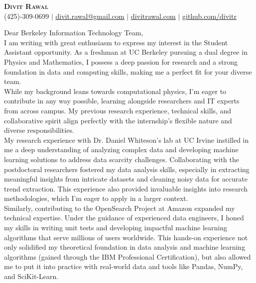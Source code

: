 \documentclass[letterpaper,11pt]{article}
\begin{document}
\begin{center}
    \textbf{\Huge \scshape Divit Rawal} \\ \vspace{1pt}
    \small (425)-309-0699 $|$ \href{mailto:divit.rawal@gmail.com}{\underline{divit.rawal@gmail.com}} $|$ 
    \href{https://www.divitrawal.com}{\underline{divitrawal.com}} $|$
    \href{https://www.github.com/divitr/}{\underline{github.com/divitr}}
\end{center}

\vspace{10mm}

Dear Berkeley Information Technology Team,\\
\vspace{5mm}
I am writing with great enthusiasm to express my interest in the Student Assistant opportunity. As a freshman at UC Berkeley pursuing a dual degree in Physics and Mathematics, I possess a deep passion for research and a strong foundation in data and computing skills, making me a perfect fit for your diverse team.\\
\vspace{5mm}
While my background leans towards computational physics, I'm eager to contribute in any way possible, learning alongside researchers and IT experts from across campus. My previous research experience, technical skills, and collaborative spirit align perfectly with the internship's flexible nature and diverse responsibilities.\\
\vspace{5mm}
My research experience with Dr. Daniel Whiteson's lab at UC Irvine instilled in me a deep understanding of analyzing complex data and developing machine learning solutions to address data scarcity challenges. Collaborating with the postdoctoral researchers fostered my data analysis skills, especially in extracting meaningful insights from intricate datasets and cleaning noisy data for accurate trend extraction. This experience also provided invaluable insights into research methodologies, which I'm eager to apply in a larger context.\\
\vspace{5mm}
Similarly, contributing to the OpenSearch Project at Amazon expanded my technical expertise. Under the guidance of experienced data engineers, I honed my skills in writing unit tests and developing impactful machine learning algorithms that serve millions of users worldwide. This hands-on experience not only solidified my theoretical foundation in data analysis and machine learning algorithms (gained through the IBM Professional Certification), but also allowed me to put it into practice with real-world data and tools like Pandas, NumPy, and SciKit-Learn.\\
\end{document}
